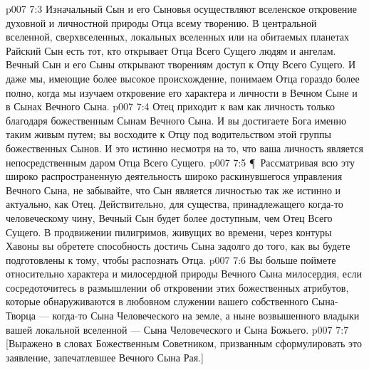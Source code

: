 \vs p007 7:3 Изначальный Сын и его Сыновья осуществляют вселенское откровение духовной и личностной природы Отца всему творению. В центральной вселенной, сверхвселенных, локальных вселенных или на обитаемых планетах Райский Сын есть тот, кто открывает Отца Всего Сущего людям и ангелам. Вечный Сын и его Сыны открывают творениям доступ к Отцу Всего Сущего. И даже мы, имеющие более высокое происхождение, понимаем Отца гораздо более полно, когда мы изучаем откровение его характера и личности в Вечном Сыне и в Сынах Вечного Сына.
\vs p007 7:4 Отец приходит к вам как личность только благодаря божественным Сынам Вечного Сына. И вы достигаете Бога именно таким живым путем; вы восходите к Отцу под водительством этой группы божественных Сынов. И это истинно несмотря на то, что ваша личность является непосредственным даром Отца Всего Сущего.
\vs p007 7:5 \P\ Рассматривая всю эту широко распространенную деятельность широко раскинувшегося управления Вечного Сына, не забывайте, что Сын является личностью так же истинно и актуально, как Отец. Действительно, для существа, принадлежащего когда\hyp{}то человеческому чину, Вечный Сын будет более доступным, чем Отец Всего Сущего. В продвижении пилигримов, живущих во времени, через контуры Хавоны вы обретете способность достичь Сына задолго до того, как вы будете подготовлены к тому, чтобы распознать Отца.
\vs p007 7:6 Вы больше поймете относительно характера и милосердной природы Вечного Сына милосердия, если сосредоточитесь в размышлении об откровении этих божественных атрибутов, которые обнаруживаются в любовном служении вашего собственного Сына\hyp{}Творца --- когда\hyp{}то Сына Человеческого на земле, а ныне возвышенного владыки вашей локальной вселенной --- Сына Человеческого и Сына Божьего.
\vs p007 7:7 [Выражено в словах Божественным Советником, призванным сформулировать это заявление, запечатлевшее Вечного Сына Рая.]
